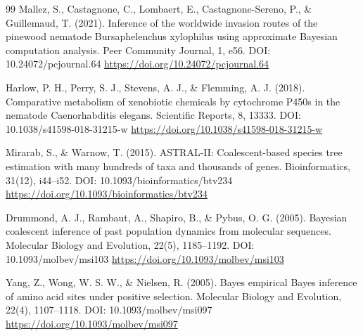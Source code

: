 \documentclass[10pt,letterpaper]{article}
\begin{document}
\begin{thebibliography}{99}
 Mallez, S., Castagnone, C., Lombaert, E., Castagnone-Sereno, P., \& Guillemaud, T. (2021). Inference of the worldwide invasion routes of the pinewood nematode Bursaphelenchus xylophilus using approximate Bayesian computation analysis. Peer Community Journal, 1, e56. DOI: 10.24072/pcjournal.64 \url{https://doi.org/10.24072/pcjournal.64}

 Harlow, P. H., Perry, S. J., Stevens, A. J., \& Flemming, A. J. (2018). Comparative metabolism of xenobiotic chemicals by cytochrome P450s in the nematode Caenorhabditis elegans. Scientific Reports, 8, 13333. DOI: 10.1038/s41598-018-31215-w \url{https://doi.org/10.1038/s41598-018-31215-w}

 Mirarab, S., \& Warnow, T. (2015). ASTRAL-II: Coalescent-based species tree estimation with many hundreds of taxa and thousands of genes. Bioinformatics, 31(12), i44--i52. DOI: 10.1093/bioinformatics/btv234 \url{https://doi.org/10.1093/bioinformatics/btv234}

 Drummond, A. J., Rambaut, A., Shapiro, B., \& Pybus, O. G. (2005). Bayesian coalescent inference of past population dynamics from molecular sequences. Molecular Biology and Evolution, 22(5), 1185--1192. DOI: 10.1093/molbev/msi103 \url{https://doi.org/10.1093/molbev/msi103}

 Yang, Z., Wong, W. S. W., \& Nielsen, R. (2005). Bayes empirical Bayes inference of amino acid sites under positive selection. Molecular Biology and Evolution, 22(4), 1107--1118. DOI: 10.1093/molbev/msi097 \url{https://doi.org/10.1093/molbev/msi097}

\end{thebibliography}
\end{document}
